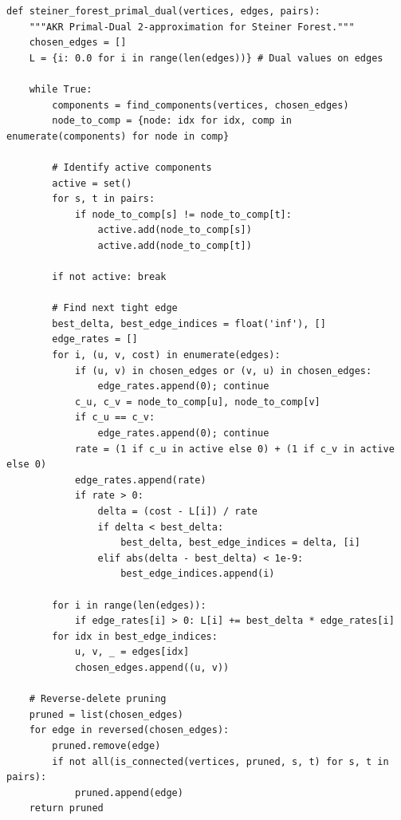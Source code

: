 \documentclass[11pt,oneside]{book}
\begin{document}
\begin{lstlisting}[style=python, caption=Primal-Dual Steiner Forest Algorithm]
def steiner_forest_primal_dual(vertices, edges, pairs):
    """AKR Primal-Dual 2-approximation for Steiner Forest."""
    chosen_edges = []
    L = {i: 0.0 for i in range(len(edges))} # Dual values on edges
    
    while True:
        components = find_components(vertices, chosen_edges)
        node_to_comp = {node: idx for idx, comp in enumerate(components) for node in comp}
        
        # Identify active components
        active = set()
        for s, t in pairs:
            if node_to_comp[s] != node_to_comp[t]:
                active.add(node_to_comp[s])
                active.add(node_to_comp[t])
                
        if not active: break
        
        # Find next tight edge
        best_delta, best_edge_indices = float('inf'), []
        edge_rates = []
        for i, (u, v, cost) in enumerate(edges):
            if (u, v) in chosen_edges or (v, u) in chosen_edges:
                edge_rates.append(0); continue
            c_u, c_v = node_to_comp[u], node_to_comp[v]
            if c_u == c_v:
                edge_rates.append(0); continue
            rate = (1 if c_u in active else 0) + (1 if c_v in active else 0)
            edge_rates.append(rate)
            if rate > 0:
                delta = (cost - L[i]) / rate
                if delta < best_delta:
                    best_delta, best_edge_indices = delta, [i]
                elif abs(delta - best_delta) < 1e-9:
                    best_edge_indices.append(i)
                    
        for i in range(len(edges)):
            if edge_rates[i] > 0: L[i] += best_delta * edge_rates[i]
        for idx in best_edge_indices:
            u, v, _ = edges[idx]
            chosen_edges.append((u, v))
            
    # Reverse-delete pruning
    pruned = list(chosen_edges)
    for edge in reversed(chosen_edges):
        pruned.remove(edge)
        if not all(is_connected(vertices, pruned, s, t) for s, t in pairs):
            pruned.append(edge)
    return pruned
\end{lstlisting}
\end{document}

